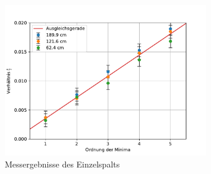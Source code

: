 \documentclass[11pt, a4paper]{article}
\begin{document}
    \begin{figure}
        \centering
        \includegraphics[width=0.8\textwidth]{./plots/einzelspalt.pdf}
        \caption{Messergebnisse des Einzelspalts}
        \label{fig:einzelspalt}
    \end{figure}

    
    
\end{document}

